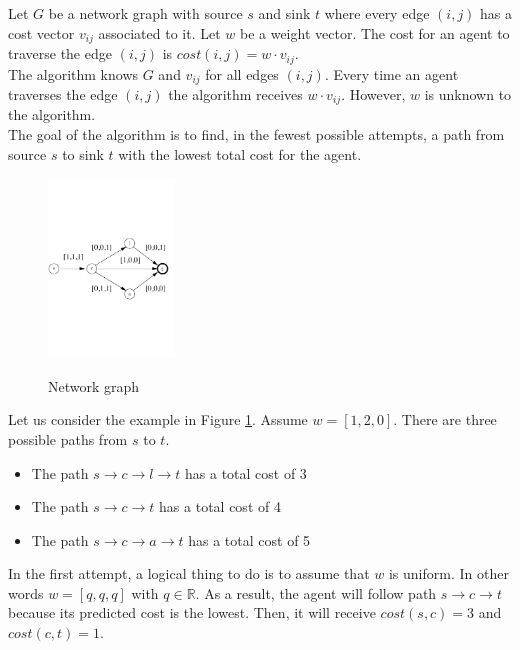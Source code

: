 Let $G$ be a network graph with source $s$ and sink $t$ where every edge $(i,j)$ has a cost vector $v_{ij}$ associated to it. Let $w$ be a weight vector. The cost for an agent to traverse the edge $(i,j)$ is $cost(i,j)=w \cdot v_{ij}$. \\

The algorithm knows $G$ and  $v_{ij}$ for all edges $(i,j)$.  Every time an agent traverses the edge $(i,j)$ the algorithm receives $w \cdot v_{ij}$. However, $w$ is unknown to the algorithm.\\

The goal of the algorithm is to find, in the fewest possible attempts, a path from source $s$ to sink $t$ with the lowest total cost for the agent. \\

\begin{figure}
  \centering
  \includegraphics[width=0.3\textwidth]{figures/section3.pdf}
  \label{fig:sec3.1}
  \caption{Network graph}
\end{figure}

Let us consider the example in Figure \ref{fig:sec3.1}. Assume $w=[1,2,0]$. There are three possible paths from $s$ to $t$.
\begin{itemize}
  \item The path $s\to c \to l \to t$ has a total cost of 3
  \item The path $s\to c \to t$ has a total cost of 4
  \item The path $s\to c \to a \to t$ has a total cost of 5\\
\end{itemize}

In the first attempt, a logical thing to do is to assume that $w$ is uniform. In other words $w = [q,q,q]$ with $q \in \mathbb{R}$. As a result, the agent will follow path $s\to c \to t$ because its predicted cost is the lowest. Then, it will receive $cost(s,c)=3$ and $cost(c,t)=1$.  \\

